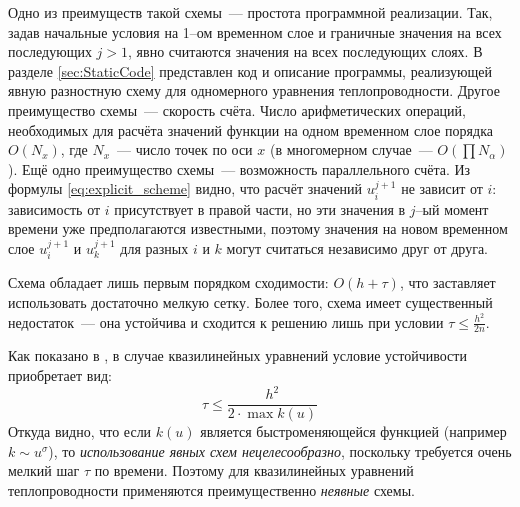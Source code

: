 Одно из преимуществ такой схемы~--- простота программной реализации.
Так, задав начальные условия на 1--ом временном слое и граничные значения на всех последующих $j > 1$, явно считаются значения на всех последующих слоях.
В разделе \ref{sec:StaticCode} представлен код и описание программы, реализующей явную разностную схему для одномерного уравнения теплопроводности.
Другое преимущество схемы~--- скорость счёта.
Число арифметических операций, необходимых для расчёта значений функции на одном временном слое порядка $O(N_x)$, где $N_x$~--- число точек по оси $x$ (в многомерном случае~--- $O(\prod N_{\alpha})$).
Ещё одно преимущество схемы~--- возможность параллельного счёта.
Из формулы \eqref{eq:explicit_scheme} видно, что расчёт значений $u_i^{j + 1}$ не зависит от $i$: зависимость от $i$ присутствует в правой части, но эти значения в $j$--ый момент времени уже предполагаются известными, поэтому значения на новом временном слое $u_i^{j + 1}$ и $u_k^{j + 1}$ для разных $i$ и $k$ могут считаться независимо друг от друга.

Схема обладает лишь первым порядком сходимости: $O(h + \tau)$, что заставляет использовать достаточно мелкую сетку.
Более того, схема имеет существенный недостаток~--- она устойчива и сходится к решению лишь при условии
$
\tau \le \frac{h^2}{2n}
$.

Как показано в \cite{СамарскийТеорияРазностныхСхем}, в случае квазилинейных уравнений условие устойчивости приобретает вид:
\begin{equation*}
    \tau \le \frac{h^2 }{2 \cdot \max{k(u)}}
\end{equation*}
Откуда видно, что если $k(u)$ является быстроменяющейся функцией (например $k \sim u^\sigma$), то \emph{использование явных схем нецелесообразно}, поскольку требуется очень мелкий шаг $\tau$ по времени.
Поэтому для квазилинейных уравнений теплопроводности применяются преимущественно \emph{неявные} схемы.